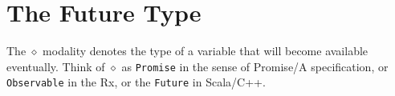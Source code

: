 \section{The Future Type}

The $\diamond$ modality denotes the type of a variable that will become available eventually. Think of $\diamond$ as \texttt{Promise} in the sense of Promise/A specification, or \texttt{Observable} in the Rx, or the \texttt{Future} in Scala/C++.